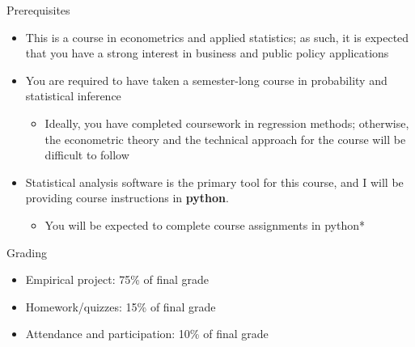 \documentclass[handout, 8pt]{beamer}
\begin{document}
\begin{frame}{Prerequisites}

\begin{itemize}

    \item This is a course in econometrics and applied statistics; as such, it is expected that you have a strong interest in business and public policy applications


\vspace{1em}
\item You are required to have taken a semester-long course in probability and statistical inference 

\begin{itemize}
    \item Ideally, you have completed coursework in regression methods; otherwise, the econometric theory and the technical approach for the course will be difficult to follow
\end{itemize}

\pause
\vspace{1em}
\item Statistical analysis software is the primary tool for this course, and I will be providing course instructions in \textbf{python}. 
\begin{itemize}
    \item You will be expected to complete course assignments in python*
\end{itemize}

\end{itemize}

\end{frame}

\begin{frame}{Grading}

\begin{itemize}
    \item Empirical project: 75\% of final grade


    \vspace{2em}
    \item Homework/quizzes: 15\% of final grade

    \vspace{2em}
    \item Attendance and participation: 10\% of final grade
\end{itemize}

\end{frame}
\end{document}
